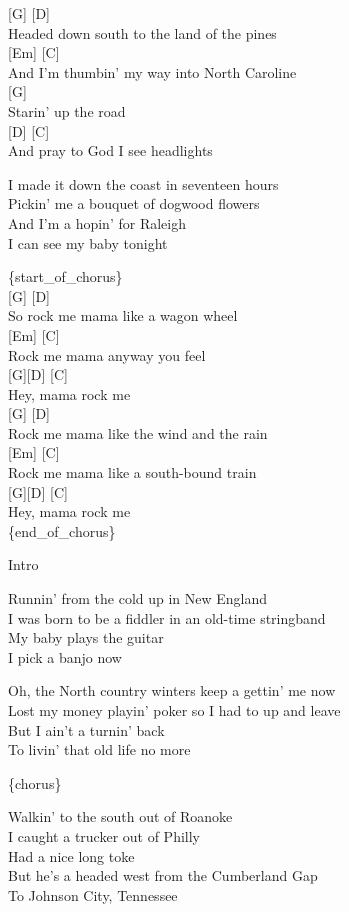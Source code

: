\documentclass[
  letterpaper,
  DIV=11,
  numbers=noendperiod]{scrreprt}
\begin{document}
{[}G{]} {[}D{]}\\
Headed down south to the land of the pines\\
{[}Em{]} {[}C{]}\\
And I'm thumbin' my way into North Caroline\\
{[}G{]}\\
Starin' up the road\\
{[}D{]} {[}C{]}\\
And pray to God I see headlights

I made it down the coast in seventeen hours\\
Pickin' me a bouquet of dogwood flowers\\
And I'm a hopin' for Raleigh\\
I can see my baby tonight

\{start\_of\_chorus\}\\
{[}G{]} {[}D{]}\\
So rock me mama like a wagon wheel\\
{[}Em{]} {[}C{]}\\
Rock me mama anyway you feel\\
{[}G{]}{[}D{]} {[}C{]}\\
Hey, mama rock me\\
{[}G{]} {[}D{]}\\
Rock me mama like the wind and the rain\\
{[}Em{]} {[}C{]}\\
Rock me mama like a south-bound train\\
{[}G{]}{[}D{]} {[}C{]}\\
Hey, mama rock me\\
\{end\_of\_chorus\}

Intro

Runnin' from the cold up in New England\\
I was born to be a fiddler in an old-time stringband\\
My baby plays the guitar\\
I pick a banjo now

Oh, the North country winters keep a gettin' me now\\
Lost my money playin' poker so I had to up and leave\\
But I ain't a turnin' back\\
To livin' that old life no more

\{chorus\}

Walkin' to the south out of Roanoke\\
I caught a trucker out of Philly\\
Had a nice long toke\\
But he's a headed west from the Cumberland Gap\\
To Johnson City, Tennessee
\end{document}
